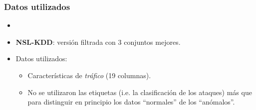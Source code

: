 \begin{frame}[t,fragile]
	\frametitle {Datos utilizados}
	
	\begin{itemize}
		\item \color{red}{KDDCup 99 es criticada en la comunidad principalmente por tener mucha redundancia y también por su bajo nivel de dificultad.}
		
		\pause
		\item \color{black}\textbf{NSL-KDD}: versión filtrada con 3 conjuntos mejores.
		\item Datos utilizados:
		\begin{itemize}
			\item Características de \textit{tráfico} (19 columnas).
			\item No se utilizaron las etiquetas (i.e. la clasificación de los ataques) más que para distinguir en principio los datos ``normales'' de los ``anómalos''.
		\end{itemize}
	\end{itemize}

	\begin{table}[htp]
		\centering
		\footnotesize\setlength{\tabcolsep}{3pt}
		\caption{Descripción básica de los conjuntos de datos utilizados.}
		\label{tab:dimension-datos}
	\end{table}

\end{frame}
\watermarkon
